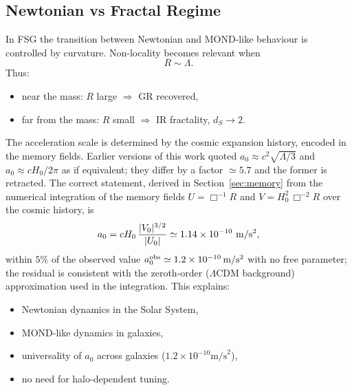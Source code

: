 \documentclass[11pt,a4paper]{article}
\begin{document}
\begin{onehalfspacing}
\section{Newtonian vs Fractal Regime}
In FSG the transition between Newtonian and MOND-like behaviour is controlled
by curvature. Non-locality becomes relevant when
\begin{equation}
R \sim \Lambda.
\label{eq:RsimLambda}
\end{equation}
Thus:
\begin{itemize}
    \item near the mass: $R$ large $\Rightarrow$ GR recovered,
    \item far from the mass: $R$ small $\Rightarrow$ IR fractality, $d_S\to 2$.
\end{itemize}
The acceleration scale is determined by the cosmic expansion history, encoded in the memory fields. Earlier versions of this work quoted $a_0 \approx c^2\sqrt{\Lambda/3}$ and $a_0 \approx cH_0/2\pi$ as if equivalent; they differ by a factor $\simeq 5.7$ and the former is retracted. The correct statement, derived in Section~\ref{sec:memory} from the numerical integration of the memory fields $U = \Box^{-1}R$ and $V = H_0^2\,\Box^{-2}R$ over the cosmic history, is
\begin{equation}
a_{0} = c H_0\, \frac{|V_0|^{3/2}}{|U_0|} \simeq 1.14 \times 10^{-10}\ {\rm m/s^2},
\label{eq:a0_memory}
\end{equation}
within $5\%$ of the observed value $a_0^{\rm obs} \simeq 1.2\times10^{-10}\,{\rm m/s^2}$ with no free parameter; the residual is consistent with the zeroth-order ($\Lambda$CDM background) approximation used in the integration.
This explains:
\begin{itemize}
    \item Newtonian dynamics in the Solar System,
    \item MOND-like dynamics in galaxies,
    \item universality of $a_0$ across galaxies ($1.2 \times 10^{-10} \text{m/s}^2$),
    \item no need for halo-dependent tuning.
\end{itemize}

\end{onehalfspacing}
\end{document}
